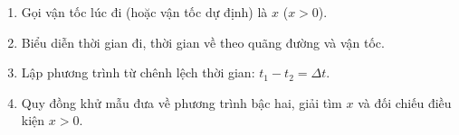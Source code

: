 \begin{enumerate}
\item Gọi vận tốc lúc đi (hoặc vận tốc dự định) là $x$ ($x > 0$).
\item Biểu diễn thời gian đi, thời gian về theo quãng đường và vận tốc.
\item Lập phương trình từ chênh lệch thời gian: $t_1 - t_2 = \Delta t$.
\item Quy đồng khử mẫu đưa về phương trình bậc hai, giải tìm $x$ và đối chiếu điều kiện $x > 0$.
\end{enumerate}
